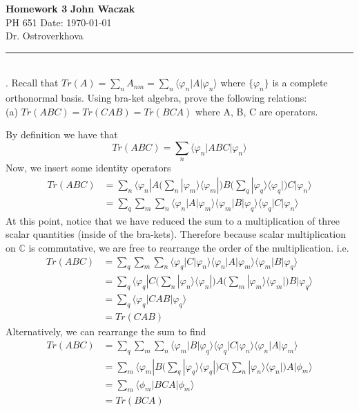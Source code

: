 \documentclass[a4paper, 11pt]{article}
\newcommand{\C}{\mathbb{C}}
\newcommand{\ket}[1]{|#1\rangle}
\newcommand{\bra}[1]{\langle #1 |}
\newenvironment{solution}{%
	\begin{list}{}{%
			\setlength{\topsep}{0pt}%
			\setlength{\leftmargin}{1.5cm}%
			\setlength{\rightmargin}{1.5cm}%
			\setlength{\listparindent}{\parindent}%
			\setlength{\itemindent}{\parindent}%
			\setlength{\parsep}{\parskip}%
	}%
	\item[]}{\end{list}}
\begin{document}
\noindent
\large\textbf{Homework 3} \hfill \textbf{John Waczak} \\
\normalsize PH 651 \hfill  Date: \today \\
Dr. Ostroverkhova
\par\noindent\rule{\textwidth}{0.4pt} \\	
	
	
. Recall that $Tr(A) = \sum_nA_{nm} = \sum_n\bra{\varphi_n}A\ket{\varphi_n}$ where $\{\varphi_n\}$ is a complete orthonormal basis. Using bra-ket algebra, prove the following relations: \\

\noindent (a) $Tr(ABC) = Tr(CAB) = Tr(BCA)$ where A, B, C are operators. \\
	\begin{solution}
		\noindent By definition we have that 
			\begin{equation*}
				Tr(ABC) = \sum_n \bra{\varphi_n}ABC\ket{\varphi_n}
			\end{equation*}
		Now, we insert some identity operators 
			\begin{align*}
				Tr(ABC) &= \sum_n \bra{\varphi_n} A \Big(\sum_n \ket{\varphi_m}\bra{\varphi_m}\Big) B \Big(\sum_q \ket{\varphi_q}\bra{\varphi_q}\Big) C \ket{\varphi_n} \\ 
					&= \sum_q\sum_m\sum_n \bra{\varphi_n}A\ket{\varphi_m}\bra{\varphi_m}B\ket{\varphi_q}\bra{\varphi_q}C\ket{\varphi_n}
			\end{align*}
		At this point, notice that we have reduced the sum to a multiplication of three scalar quantities (inside of the bra-kets). Therefore because scalar multiplication on $\C$ is commutative, we are free to rearrange the order of the multiplication. i.e. 
			\begin{align*}
				Tr(ABC) &= \sum_q\sum_m\sum_n \bra{\varphi_q}C\ket{\varphi_n}\bra{\varphi_n}A\ket{\varphi_m}\bra{\varphi_m}B\ket{\varphi_q} \\
					&= \sum_q \bra{\varphi_q} C \Big(\sum_n\ket{\varphi_n}\bra{\varphi_n}\Big) A \Big(\sum_m\ket{\varphi_m}\bra{\varphi_m}\Big) B \ket{\varphi_q} \\ 
					&= \sum_q \bra{\varphi_q} CAB \ket{\varphi_q} \\
					&= Tr(CAB) 
			\end{align*}
		Alternatively, we can rearrange the sum to find 
			\begin{align*}
				Tr(ABC) &= \sum_q\sum_m\sum_n \bra{\varphi_m}B\ket{\varphi_q}\bra{\varphi_q}C\ket{\varphi_n}\bra{\varphi_n}A\ket{\varphi_m} \\
					&= \sum_m \bra{\varphi_m} B \Big(\sum_q\ket{\varphi_q}\bra{\varphi_q}\Big) C \Big(\sum_n \ket{\varphi_n}\bra{\varphi_n}\Big) A \ket{\phi_m} \\ 
					&= \sum_m \bra{\phi_m}BCA\ket{\phi_m} \\ 
					&= Tr(BCA)
			\end{align*}
	\end{solution}
	
\end{document}
